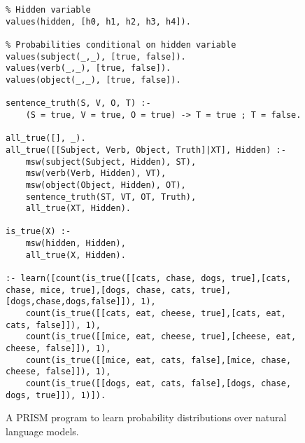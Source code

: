 \documentclass[letterpaper]{article}
\begin{document}
\begin{figure}
\begin{lstlisting}
% Hidden variable
values(hidden, [h0, h1, h2, h3, h4]).

% Probabilities conditional on hidden variable
values(subject(_,_), [true, false]).
values(verb(_,_), [true, false]).
values(object(_,_), [true, false]).

sentence_truth(S, V, O, T) :-
	(S = true, V = true, O = true) -> T = true ; T = false.

all_true([], _).
all_true([[Subject, Verb, Object, Truth]|XT], Hidden) :-
	msw(subject(Subject, Hidden), ST),
	msw(verb(Verb, Hidden), VT),
	msw(object(Object, Hidden), OT),
	sentence_truth(ST, VT, OT, Truth),
	all_true(XT, Hidden).

is_true(X) :-
	msw(hidden, Hidden),
	all_true(X, Hidden).

:- learn([count(is_true([[cats, chase, dogs, true],[cats, chase, mice, true],[dogs, chase, cats, true],[dogs,chase,dogs,false]]), 1),
	count(is_true([[cats, eat, cheese, true],[cats, eat, cats, false]]), 1),
	count(is_true([[mice, eat, cheese, true],[cheese, eat, cheese, false]]), 1),
	count(is_true([[mice, eat, cats, false],[mice, chase, cheese, false]]), 1),
	count(is_true([[dogs, eat, cats, false],[dogs, chase, dogs, true]]), 1)]).
\end{lstlisting}
\caption{A PRISM program to learn probability distributions over
  natural language models.}
\end{figure}




\end{document}
